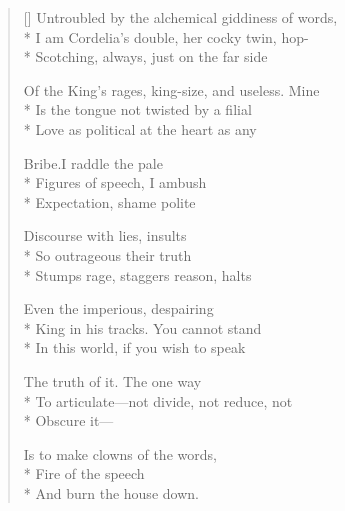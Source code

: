 \label{ch:lear_aj}
\begin{verse}[\versewidth]
Untroubled by the alchemical giddiness of words,\\*
I am Cordelia's double, her cocky twin, hop-\\*
Scotching, always, just on the far side

Of the King's rages, king-size, and useless.   Mine\\*
Is the tongue not twisted by a filial\\*
Love as political at the heart as any

Bribe.\qquad I raddle the pale\\*
Figures of speech, I ambush\\*
Expectation, shame polite

Discourse with lies, insults\\*
So outrageous their truth\\*
Stumps rage, staggers reason, halts

Even the imperious, despairing\\*
King in his tracks.\hspace*{3\vgap} You cannot stand\\*
In this world, if you wish to speak

The truth of it.  The one way\\*
To articulate---not divide, not reduce, not\\*
Obscure it---

\hspace*{3\vgap} Is to make clowns of the words,\\*
Fire of the speech\\*
And burn the house down.
\end{verse}
